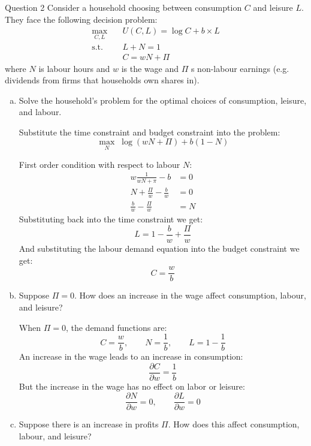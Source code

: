 \documentclass[a4paper]{article}
\newif\IfInSansMode
\begin{document}
	\begin{questionbox}{Question 2}
		Consider a household choosing between consumption \( C \) and leisure \( L \). They face the following decision problem:
		\begin{align*}
			\max_{C,L}\quad &U(C,L) = \log C + b \times L\\
			\text{s.t.}\quad &L + N = 1\\
			& C = wN + \Pi
		\end{align*}
		where \( N \) is labour hours and \( w \) is the wage and \( \Pi \) s non-labour earnings (e.g. dividends from firms that households own shares in).
		\begin{enumerate}[(a)]
			\item Solve the household's problem for the optimal choices of consumption, leisure, and labour.
			\begin{explanationbox}
				Substitute the time constraint and budget constraint into the problem:
				\[
					\max_N\; \log(wN+\Pi)+b(1-N)
				\]
			\end{explanationbox}
			\begin{explanationbox}
				First order condition with respect to labour \( N \):
				\begin{align*}
					w\frac{1}{wN+\pi}-b&=0\\
					N+\frac{\Pi}{w}-\frac{b}{w} &=0\\
					\frac{b}{w}-\frac{\Pi}{w} &= N
				\end{align*}
				Substituting back into the time constraint we get:
				\[
					L = 1 - \frac{b}{w}+\frac{\Pi}{w}
				\]
				And substituting the labour demand equation into the budget constraint we get:
				\[
					C = \frac{w}{b}
				\]
			\end{explanationbox}
			\item Suppose \( \Pi = 0 \). How does an increase in the wage affect consumption, labour, and leisure?
			\begin{explanationbox}
				When \( \Pi = 0 \), the demand functions are:
				\[
					C = \frac{w}{b}, \qquad N = \frac{1}{b}, \qquad L= 1-\frac{1}{b}
				\]
				An increase in the wage leads to an increase in consumption:
				\[
					\frac{\partial C}{\partial w} = \frac{1}{b}
				\]
				But the increase in the wage has no effect on labor or leisure:
				\[
					\frac{\partial N}{\partial w}=0, \qquad \frac{\partial L}{\partial w} = 0
				\]
			\end{explanationbox}
			\item Suppose there is an increase in profits \( \Pi \). How does this affect consumption, labour, and leisure?

\end{enumerate}
\end{questionbox}
\end{document}
